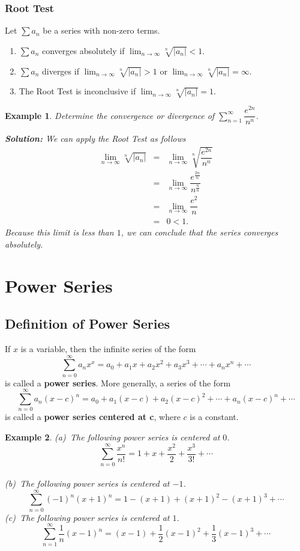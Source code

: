\documentclass[titlepage,a4paper,12pt]{report}
\newtheorem{example}{Example}[section]
\begin{document}
\subsubsection{Root Test}
Let $\displaystyle \sum a_n$ be a series with non-zero terms.
\begin{enumerate}
\item $\displaystyle \sum a_n$ converges absolutely if $\displaystyle \lim _{n\rightarrow \infty} \sqrt[n]{|a_n|}<1$.
\item $\displaystyle \sum a_n$ diverges if $\displaystyle \lim _{n\rightarrow \infty} \sqrt[n]{|a_n|}>1$ or $\displaystyle \lim _{n\rightarrow \infty} \sqrt[n]{|a_n|}=\infty$.
\item The Root Test is inconclusive if $\displaystyle \lim _{n\rightarrow \infty} \sqrt[n]{|a_n|}=1$. 
\end{enumerate}
\begin{example}
Determine the convergence or divergence of $\displaystyle \sum _{n=1}^\infty \dfrac{e^{2n}}{n^n}$.

\noindent \textbf{Solution:} We can apply the Root Test as follows 
\begin{eqnarray*}
\lim _{n\rightarrow \infty} \sqrt[n]{|a_n|} &=& \lim _{n\rightarrow \infty} \sqrt[n]{\dfrac{e^{2n}}{n^n}}\\
&=& \lim _{n\rightarrow \infty} \dfrac{e^{\frac{2n}{n}}}{n^{\frac{n}{n}}}\\
&=& \lim _{n\rightarrow \infty} \dfrac{e^2}{n}\\
&=& 0<1.
\end{eqnarray*} 
Because this limit is less than $1$, we can conclude that the series converges absolutely.
\end{example}
\section{Power Series}
\subsection{Definition of Power Series}
If $x$ is a variable, then the infinite series of the form 
\[\sum _{n=0}^\infty a_nx^x=a_0+a_1x+a_2x^2+a_3x^3+\cdots + a_nx^n+\cdots\] is called a \textbf{power series}. More generally, a series of the form 
\[\sum _{n=0}^\infty a_n(x-c)^n=a_0+a_1(x-c)+a_2(x-c)^2+\cdots +a_n(x-c)^n +\cdots\] is called a \textbf{power series centered at c}, where $c$ is a constant.
\begin{example}
(a)\, The following power series is centered at $0$.
\[\sum _{n=0}^\infty \dfrac{x^n}{n!}=1+x+\dfrac{x^2}{2}+\dfrac{x^3}{3!}+\cdots\]\\
(b)\, The following power series is centered at $-1$.
\[\sum _{n=0}^\infty (-1)^n(x+1)^n=1-(x+1)+(x+1)^2-(x+1)^3+\cdots\]
(c)\, The following power series is centered at $1$.
\[\sum _{n=1}^\infty \dfrac{1}{n}(x-1)^n=(x-1)+\dfrac{1}{2}(x-1)^2+\dfrac{1}{3}(x-1)^3+\cdots \]
\end{example}
\end{document}
